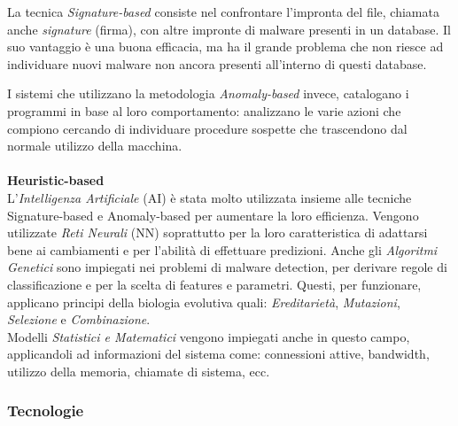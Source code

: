 La tecnica \textit{Signature-based} consiste nel confrontare l'impronta del file, chiamata anche \textit{signature} (firma), con altre impronte di malware presenti in un database. Il suo vantaggio è una buona efficacia, ma ha il grande problema che non riesce ad individuare nuovi malware non ancora presenti all'interno di questi database.

I sistemi che utilizzano la metodologia \textit{Anomaly-based} invece, catalogano i programmi in base al loro comportamento: analizzano le varie azioni che compiono cercando di individuare procedure sospette che trascendono dal normale utilizzo della macchina.\\
\\
\textbf{Heuristic-based}\\
L'\textit{Intelligenza Artificiale} (AI) è stata molto utilizzata insieme alle tecniche Signature-based e Anomaly-based per aumentare la loro efficienza. Vengono utilizzate \textit{Reti Neurali} (NN) soprattutto per la loro caratteristica di adattarsi bene ai cambiamenti e per l'abilità di effettuare predizioni. Anche gli \textit{Algoritmi Genetici} sono impiegati nei problemi di malware detection, per derivare regole di classificazione e per la scelta di features e parametri. Questi, per funzionare, applicano principi della biologia evolutiva quali: \textit{Ereditarietà}, \textit{Mutazioni}, \textit{Selezione} e \textit{Combinazione}.\\
Modelli \textit{Statistici e Matematici} vengono impiegati anche in questo campo, applicandoli ad informazioni del sistema come: connessioni attive, bandwidth, utilizzo della memoria, chiamate di sistema, ecc.

\subsubsection{Tecnologie}

